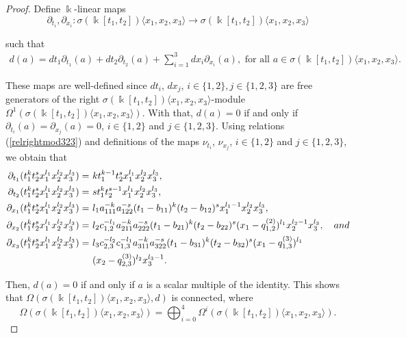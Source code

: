 \documentclass{amsart}
\theoremstyle{definition}
\theoremstyle{remark}
\numberwithin{equation}{section}
\begin{document}
\begin{proof}
Define $\Bbbk$-linear maps $$
\partial_{t_i}, \partial_{x_i}: \sigma(\Bbbk[t_1, t_2])\langle x_1, x_2, x_3\rangle \rightarrow \sigma(\Bbbk[t_1, t_2])\langle x_1, x_2, x_3\rangle
$$ 

such that
\begin{align*}
d(a)=dt_1\partial_{t_1}(a)+dt_2\partial_{t_2}(a)+\sum_{i=1}^{3}dx_i\partial_{x_i}(a), \text{ for all } a \in \sigma(\Bbbk[t_1, t_2])\langle x_1, x_2, x_3\rangle.
\end{align*}

These maps are well-defined since $dt_i$, $dx_j$, $i\in\{1, 2\}, j \in\{1, 2, 3\}$ are free generators of the right $\sigma(\Bbbk[t_1, t_2])\langle x_1, x_2, x_3\rangle$-module $\Omega^1(\sigma(\Bbbk[t_1, t_2])\langle x_1, x_2, x_3\rangle)$. With that, $d(a)=0$ if and only if $\partial_{t_i}(a)=\partial_{x_j}(a)=0$, $i\in\{1, 2\}$ and $j \in\{1, 2, 3\}$. Using relations {\rm (}\ref{relrightmod323}{\rm )} and definitions of the maps $\nu_{t_i}$, $\nu_{x_j}$, $i\in\{1, 2\}$ and $j \in\{1, 2, 3\}$, we obtain that
\begin{align}
\partial_{t_1}(t_1^kt_2^{s}x_1^{l_1}x_2^{l_2}x_3^{l_3}) = &\ kt_1^{k-1}t_2^{s}x_1^{l_1}x_2^{l_2}x_3^{l_3}, \\
\partial_{t_2}(t_1^kt_2^{s}x_1^{l_1}x_2^{l_2}x_3^{l_3}) = &\ st_1^kt_2^{s-1}x_1^{l_1}x_2^{l_2}x_3^{l_3}, \notag \\
\partial_{x_1}(t_1^kt_2^{s}x_1^{l_1}x_2^{l_2}x_3^{l_3}) = &\ l_1a_{111}^{-k}a_{122}^{-s}(t_1-b_{11})^k(t_2-b_{12})^sx_1^{l_1-1}x_2^{l_2}x_3^{l_3},  \notag \\
\partial_{x_2}(t_1^kt_2^{s}x_1^{l_1}x_2^{l_2}x_3^{l_3}) = &\ l_2c_{1,2}^{-l_1}a_{211}^{-k}a_{222}^{-s}(t_1-b_{21})^k(t_2-b_{22})^s(x_1-q_{1,2}^{(2)})^{l_1}x_2^{l_2-1}x_3^{l_3}, \quad {\rm and} \notag \\
\partial_{x_3}(t_1^kt_2^{s}x_1^{l_1}x_2^{l_2}x_3^{l_3}) = &\ 
l_3c_{2,3}^{-l_2}c_{1,3}^{-l_1}a_{311}^{-k}a_{322}^{-s}(t_1-b_{31})^k(t_2-b_{32})^s(x_1-q_{1,3}^{(3)})^{l_1} \notag \\
&\ (x_2-q_{2,3}^{(3)})^{l_2}x_3^{l_3-1}. \notag
\end{align}

Then, $d(a)=0$ if and only if $a$ is a scalar multiple of the identity. This shows that $\Omega(\sigma(\Bbbk[t_1, t_2])\langle x_1, x_2, x_3\rangle,d)$ is connected, where 
\[
\Omega(\sigma(\Bbbk[t_1, t_2])\langle x_1, x_2, x_3\rangle) = \bigoplus_{i=0}^{4}\Omega^i(\sigma(\Bbbk[t_1, t_2])\langle x_1, x_2, x_3\rangle).
\]


\end{proof}
\end{document}
